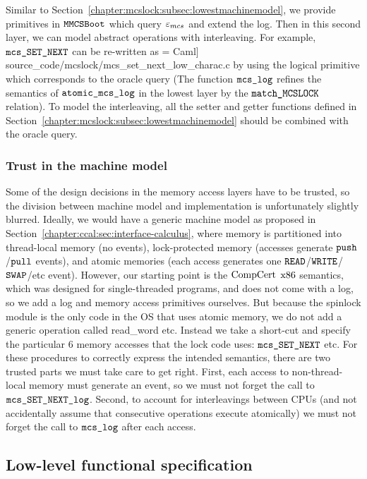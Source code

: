 Similar to Section~\ref{chapter:mcslock:subsec:lowestmachinemodel}, 
we provide primitives in ${\mathrm{\texttt{MMCSBoot}}}$ which query ${\varepsilon}_{mcs}$ and extend the log.
Then in this second layer, we can model abstract operations with interleaving.
For example, ${\mathrm{\texttt{mcs\_SET\_NEXT}}}$ can be re-written as
 = Caml] {source_code/mcslock/mcs_set_next_low_charac.c}
by using the logical primitive which corresponds to the oracle query
(The function ${\mathrm{\texttt{mcs\_log}}}$ refines the semantics of ${\mathrm{\texttt{atomic\_mcs\_log}}}$ in the lowest layer by the ${\mathrm{\texttt{match\_MCSLOCK}}}$ relation).
To model the interleaving, all the setter and getter functions defined
in Section~\ref{chapter:mcslock:subsec:lowestmachinemodel} should be combined with the
oracle query.

\subsubsection{Trust in the machine model}
Some of the design decisions in the memory access
layers have to be trusted, so the division between machine model and
implementation is unfortunately slightly blurred.
Ideally, we would have a generic machine model as proposed in Section~\ref{chapter:ccal:sec:interface-calculus}, where memory is partitioned into thread-local
memory (no events), lock-protected memory (accesses generate ${\mathrm{\texttt{push}}}$/${\mathrm{\texttt{pull}}}$
events), and atomic memories (each access
generates one ${\mathrm{\texttt{READ}}}$/${\mathrm{\texttt{WRITE}}}$/${\mathrm{\texttt{SWAP}}}$/etc event).  However, our starting point
is the $\mathrm{CompCert}$ $\mathrm{x86}$ semantics, which was designed for single-threaded
programs, and does not come with a log, so we add a log and memory access
primitives ourselves.
But because the spinlock module is the only code in the OS that uses
atomic memory, we do not add a generic operation called
read\_word etc. Instead we take a short-cut and specify the particular
6 memory accesses that the lock code uses: ${\mathrm{\texttt{mcs\_SET\_NEXT}}}$ etc.
For these procedures to correctly express the intended semantics,
there are two trusted parts we must take care to get right. First,
each access to non-thread-local memory must generate an event, so we
must not forget the call to
${\mathrm{\texttt{mcs\_SET\_NEXT\_log}}}$.
Second, to account for
interleavings between CPUs (and not accidentally assume that consecutive
operations execute atomically) we must not forget the call to
${\mathrm{\texttt{mcs\_log}}}$ after each access.


\subsection{Low-level functional specification}
\label{chapter:mcslock:subsec:atomicoperation}

